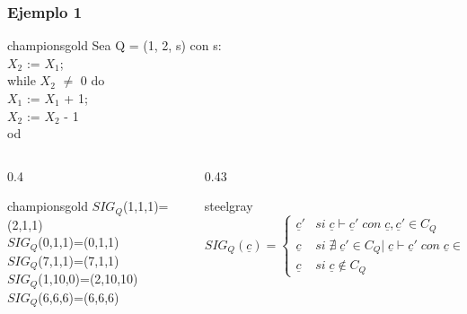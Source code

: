 \documentclass[xcolor=table]{beamer}
\begin{document}
\begin{frame}[fragile]\frametitle{Ejemplo 1} \footnotesize  


        \begin{colorblock}[black]{championsgold}{}\scriptsize
        Sea Q = (1, 2, s) con s: \\
        \hspace{0.5cm}   $X_2$ := $X_1$;\\
        \hspace{0.5cm}   while $X_2$ $\neq$ 0 do \\
        \hspace{0.75cm}    $X_1$ := $X_1$ + 1;\\
        \hspace{0.75cm}    $X_2$ := $X_2$ - 1\\
        \hspace{0.5cm}  od
        \end{colorblock}


\begin{columns}

    \begin{column}{0.4\textwidth}
        \begin{colorblock}[black]{championsgold}{}\scriptsize
        $SIG_Q$(1,1,1)=(2,1,1) \\
        $SIG_Q$(0,1,1)=(0,1,1) \\
        $SIG_Q$(7,1,1)=(7,1,1)\\
        $SIG_Q$(1,10,0)=(2,10,10)\\
        $SIG_Q$(6,6,6)=(6,6,6)\\
        \end{colorblock}
        \end{column}

    \begin{column}{0.43\textwidth}
        \begin{colorblock}[white]{steelgray}{}\scriptsize
           \scriptsize\begin{equation*} SIG_Q(\underline{c}) = 
            \begin{cases} 
                    \underline{c}'      & si\; \underline{c} \vdash  \underline{c}' \;con \;\underline{c}, \underline{c}' \in C_Q\\
                     \underline{c}      & si\; \nexists \; \underline{c}' \in C_Q |\; \underline{c} \vdash  \underline{c}' \;con \;\underline{c} \in C_Q \\
                     \underline{c}      & si\; \underline{c} \notin C_Q 
            \end{cases} \end{equation*}   
            \end{colorblock}
    \end{column}


\end{columns}

\end{frame}
\end{document}
